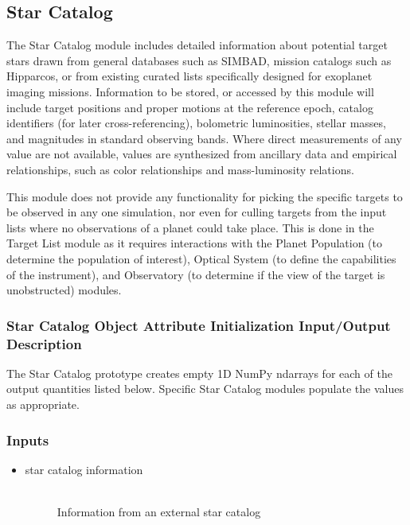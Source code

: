 \documentclass[cleanfoot]{asme2ej}
\begin{document}
\subsection{Star Catalog} \label{sec:starcatalog}
The Star Catalog module includes detailed information about potential target stars drawn from general databases such as SIMBAD, mission catalogs such as Hipparcos, or from existing curated lists specifically designed for exoplanet imaging missions.  Information to be stored, or accessed by this module will include target positions and proper motions at the reference epoch, catalog identifiers (for later cross-referencing), bolometric luminosities, stellar masses, and magnitudes in standard observing bands.  Where direct measurements of any value are not available, values are synthesized from ancillary data and empirical relationships, such as color relationships and mass-luminosity relations.

This module does not provide any functionality for picking the specific targets to be observed in any one simulation, nor even for culling targets from the input lists where no observations of a planet could take place.  This is done in the Target List module as it requires interactions with the Planet Population (to determine the population of interest), Optical System (to define the capabilities of the instrument), and Observatory (to determine if the view of the target is unobstructed) modules.

\subsubsection{Star Catalog Object Attribute Initialization Input/Output Description} 
The Star Catalog prototype creates empty 1D NumPy ndarrays for each of the output quantities listed below.  Specific Star Catalog modules populate the values as appropriate.

\subsubsection*{Inputs}
\begin{itemize}
    \item 
    \begin{description}
        \item[star catalog information] \hfill \\
        Information from an external star catalog 
    \end{description}
\end{itemize}
\end{document}
